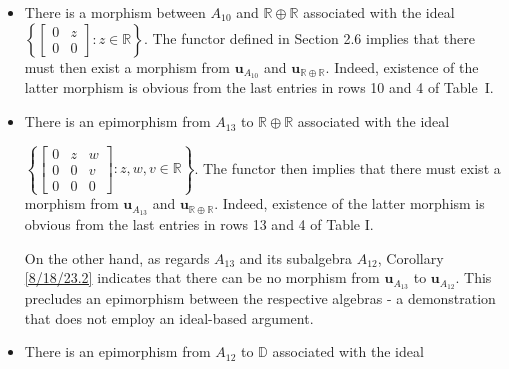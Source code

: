 \documentclass{amsart}
\numberwithin{equation}{section}
\theoremstyle{definition}
\numberwithin{theorem}{section}
\begin{document}
 \begin{itemize}
\item There is a morphism between $A_{10}$ and $\mathbb{R}\oplus\mathbb{R}$ associated with the ideal $\left\{\left[\begin{array}{ccc}
 0 & z   \\ 
 0 & 0    
\end{array}\right]:z\in \mathbb{R}\right\}$.  The functor defined in Section 2.6 implies that there must then exist a morphism from $\mathbf{u}_{A_{10}}$ and $\mathbf{u}_{\mathbb{R}\oplus\mathbb{R}}$.  Indeed, existence of the latter morphism is obvious from the last entries in rows 10 and 4 of \mbox{Table I}.
 \item There is an epimorphism from $A_{13}$ to $\mathbb{R}\oplus\mathbb{R}$ associated with the ideal

 $\left\{\left[\begin{array}{ccc}
0  & z & w   \\
 0 & 0 & v \\
 0 & 0 & 0    
\end{array}\right]:z,w,v\in\mathbb{R}\right\}$. The functor then implies that there must exist a morphism from $\mathbf{u}_{A_{13}}$ and $\mathbf{u}_{\mathbb{R}\oplus\mathbb{R}}$.  Indeed, existence of the latter morphism is obvious from the last entries in rows 13 and 4 of Table I.  

On the other hand, as regards $A_{13}$ and its subalgebra $A_{12}$, Corollary \ref{8/18/23.2} indicates that there can be no morphism from $\mathbf{u}_{A_{13}}$ to $\mathbf{u}_{A_{12}}$.     This precludes an epimorphism between the respective algebras - a demonstration that does not employ an ideal-based argument.
 \item 
There is an epimorphism from $A_{12}$ to  $\mathbb{D}$ associated with the ideal


\end{itemize}
\end{document}
